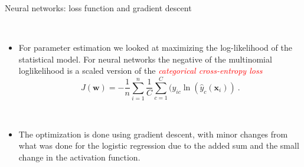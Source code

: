 \documentclass[10pt,ignorenonframetext,]{beamer}
\providecommand{\tightlist}{%
  \setlength{\itemsep}{0pt}\setlength{\parskip}{0pt}}
\begin{document}
\begin{frame}

\begin{block}{Neural networks: loss function and gradient descent}

\(~\)

\begin{itemize}
\tightlist
\item
  For parameter estimation we looked at maximizing the log-likelihood of
  the statistical model. For neural networks the negative of the
  multinomial loglikelihood is a scaled version of the
  \emph{\textcolor{red}{categorical cross-entropy loss}}
  \[ J({\boldsymbol w})=-\frac{1}{n}\sum_{i=1}^n\frac{1}{C} \sum_{c=1}^C (y_{ic}\ln({\hat{y}_c({\boldsymbol x}_i)}) \ .\]
\end{itemize}

\(~\)

\begin{itemize}
\tightlist
\item
  The optimization is done using gradient descent, with minor changes
  from what was done for the logistic regression due to the added sum
  and the small change in the activation function.
\end{itemize}

\end{block}

\end{frame}
\end{document}
